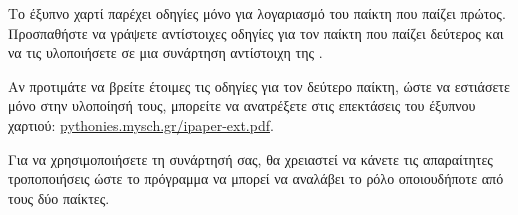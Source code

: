 \documentclass[a4paper,11pt,oneside]{book}
\begin{document}
\begin{exercise}
Το έξυπνο χαρτί παρέχει οδηγίες μόνο για λογαριασμό του παίκτη που παίζει πρώτος. Προσπαθήστε να γράψετε αντίστοιχες οδηγίες για τον παίκτη που παίζει δεύτερος και να τις υλοποιήσετε σε μια συνάρτηση αντίστοιχη της .

\begin{note}Αν προτιμάτε να βρείτε έτοιμες τις οδηγίες για τον δεύτερο παίκτη, ώστε να εστιάσετε μόνο στην υλοποίησή τους, μπορείτε να ανατρέξετε στις επεκτάσεις του έξυπνου χαρτιού:
\href{http://pythonies.mysch.gr/ipaper-ext.pdf}{\url{pythonies.mysch.gr/ipaper-ext.pdf}}.
\end{note}

Για να χρησιμοποιήσετε τη συνάρτησή σας, θα χρειαστεί να κάνετε τις απαραίτητες τροποποιήσεις ώστε το πρόγραμμα να μπορεί να αναλάβει το ρόλο οποιουδήποτε από τους δύο παίκτες.
\end{exercise}


\vfill
{}
\end{document}
